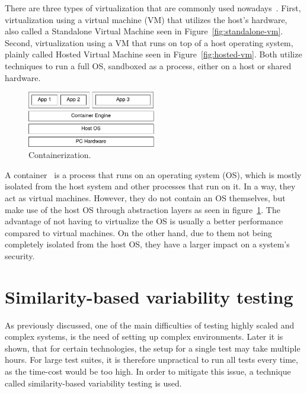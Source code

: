 There are three types of virtualization that are commonly used nowadays~\cite{containers-vs-virtual-machines, a-survey-on-virtualization-technologies}.
First, virtualization using a virtual machine (VM) that utilizes the host's hardware, also called a Standalone Virtual Machine seen in Figure~\ref{fig:standalone-vm}.
Second, virtualization using a VM that runs on top of a host operating system, plainly called Hosted Virtual Machine seen in Figure~\ref{fig:hosted-vm}.
Both utilize techniques to run a full OS, sandboxed as a process, either on a host or shared hardware.

\begin{figure}[H]
    \centering
    \includegraphics[width=0.5\textwidth]{img/background/container}
    \caption{Containerization.}
    \label{fig:containerization}
\end{figure}

A container~\cite{what-are-linux-containers} is a process that runs on an operating system (OS), which is mostly isolated from the host system and other processes that run on it.
In a way, they act as virtual machines.
However, they do not contain an OS themselves, but make use of the host OS through abstraction layers as seen in figure~\ref{fig:containerization}.
The advantage of not having to virtualize the OS is usually a better performance compared to virtual machines.
On the other hand, due to them not being completely isolated from the host OS, they have a larger impact on a system's security.



\section{Similarity-based variability testing}\label{sec:similarities}

As previously discussed, one of the main difficulties of testing highly scaled and complex systems, is the need of setting up complex environments.
Later it is shown, that for certain technologies, the setup for a single test may take multiple hours.
For large test suites, it is therefore unpractical to run all tests every time, as the time-cost would be too high.
In order to mitigate this issue, a technique called similarity-based variability testing is used.

